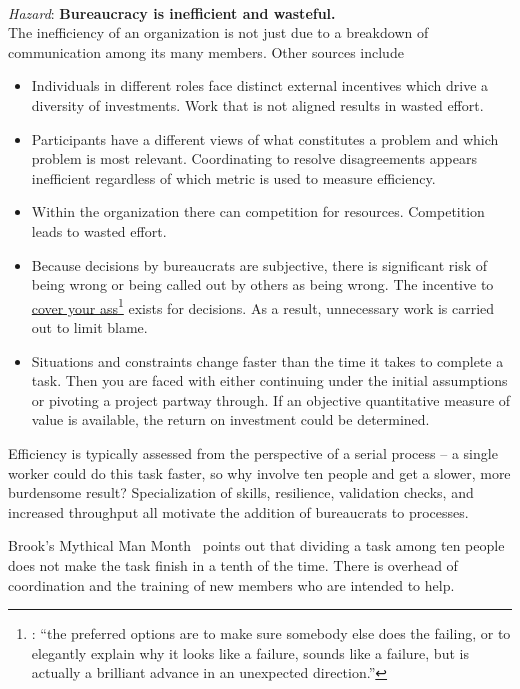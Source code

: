 \ \\
\textit{Hazard}: \textbf{Bureaucracy is inefficient and wasteful.}\\
The inefficiency of an organization is not just due to a breakdown of communication among its many members. Other sources include 
\begin{itemize}
    \item Individuals in different roles face distinct external incentives which drive a diversity of investments. Work that is not aligned results in wasted effort.
    \item Participants have a different views of what constitutes a problem and which problem is most relevant. Coordinating to resolve disagreements appears inefficient regardless of which metric is used to measure efficiency.
    \item Within the organization there can competition  for resources. Competition leads to wasted effort.
    \item Because decisions by bureaucrats are subjective, there is significant risk of being wrong or being called out by others as being wrong. The incentive to 
\href{https://en.wikipedia.org/wiki/Cover_your_ass}{
cover your ass}\footnote{
\cite{1996_unknown}: ``the preferred options are to make sure somebody else does the failing, or to elegantly explain why it looks like a failure, sounds like a failure, but is actually a brilliant advance in an unexpected direction.''}
\iftoggle{WPinmargin}{\marginpar{[Wikipedia] Cover\\your ass}}{}
exists for decisions. As a result, unnecessary work is carried out to limit blame. 
\item Situations and constraints change faster than the time it takes to complete a task.  Then you are faced with either continuing under the initial assumptions or pivoting a project partway through. If an objective quantitative measure of value is available, the return on investment could be determined.
\end{itemize}


Efficiency is typically assessed from the perspective of a serial process -- a single worker could do this task faster, so why involve ten people and get a slower, more burdensome result? Specialization of skills, resilience, validation checks, and increased throughput all  motivate the addition of bureaucrats to processes.

Brook's Mythical Man Month~\cite{1975_brooks} points out that dividing a task among ten people does not make the task finish in a tenth of the time. There is overhead of coordination and the training of new members who are intended to help. 

